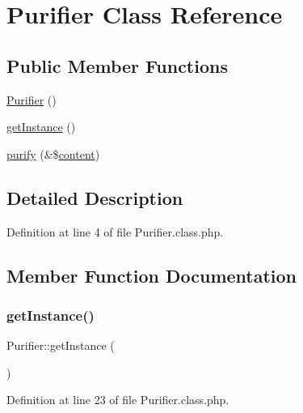 \hypertarget{classPurifier}{}\section{Purifier Class Reference}
\label{classPurifier}
\subsection*{Public Member Functions}
\begin{DoxyCompactItemize}
\item 
\hyperlink{classPurifier_a78c509e67fef53f3fabefb7a8ded9db6}{Purifier} ()
\item 
\hyperlink{classPurifier_ae552670dfe204024862ecd73c3082586}{get\+Instance} ()
\item 
\hyperlink{classPurifier_a8ef72146a37ba4e10453c9465835bd67}{purify} (\&\$\hyperlink{classcontent}{content})
\end{DoxyCompactItemize}


\subsection{Detailed Description}


Definition at line 4 of file Purifier.\+class.\+php.



\subsection{Member Function Documentation}
\mbox{\label{classPurifier_ae552670dfe204024862ecd73c3082586}} 
\subsubsection{\texorpdfstring{get\+Instance()}{getInstance()}}
{\footnotesize\ttfamily Purifier\+::get\+Instance (\begin{DoxyParamCaption}{ }\end{DoxyParamCaption})}



Definition at line 23 of file Purifier.\+class.\+php.

\mbox{\label{classPurifier_a78c509e67fef53f3fabefb7a8ded9db6}} 
